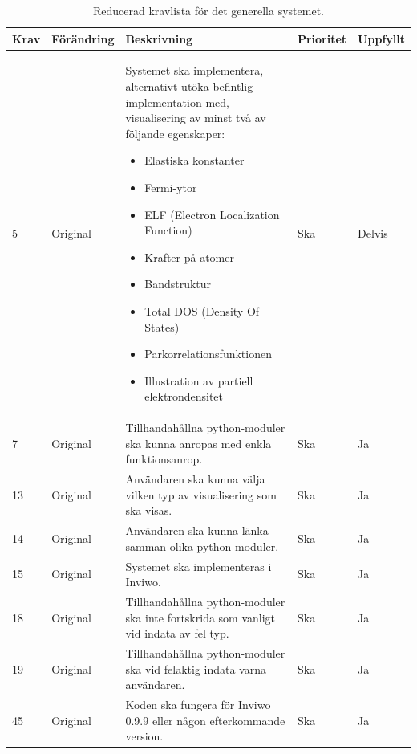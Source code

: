 \documentclass[a4paper,12pt]{article}
\begin{document}
\begin{table}[H]
\caption{Reducerad kravlista för det generella systemet.}
\begin{center}
\begin{tabular}{ |p{10mm}|p{20mm}|p{70mm}|p{15mm}|p{15mm}|}
\hline
 \textbf{Krav} & \textbf{Förändring} & \textbf{Beskrivning} & \textbf{Prioritet} & \textbf{Uppfyllt}  \\ 
\hline
 5 & Original & Systemet ska implementera, alternativt utöka befintlig implementation med, visualisering av minst två av följande egenskaper:
  \begin{itemize}
  \item Elastiska konstanter
  \item Fermi-ytor
  \item ELF (Electron Localization Function)
  \item Krafter på atomer
  \item Bandstruktur
  \item Total DOS (Density Of States)
  \item Parkorrelationsfunktionen
  \item Illustration av partiell elektrondensitet
  \end{itemize} & Ska & Delvis \\
\hline
7 & Original & Tillhandahållna python-moduler ska kunna anropas med enkla funktionsanrop. & Ska & Ja \\
\hline
13 & Original & Användaren ska kunna välja vilken typ av visualisering som ska visas. & Ska & Ja \\
\hline
14 & Original & Användaren ska kunna länka samman olika python-moduler. & Ska & Ja \\
\hline
15 & Original & Systemet ska implementeras i Inviwo. & Ska & Ja \\
\hline
18 & Original & Tillhandahållna python-moduler ska inte fortskrida som vanligt vid indata av fel typ. & Ska & Ja \\
\hline
19 & Original & Tillhandahållna python-moduler ska vid felaktig indata varna användaren. & Ska & Ja \\
\hline
45 & Original & Koden ska fungera för Inviwo 0.9.9 eller någon efterkommande version. & Ska & Ja \\
\hline

\end{tabular}
\label{table:kravlista generella systemet}
\end{center}
\end{table}
\end{document}
